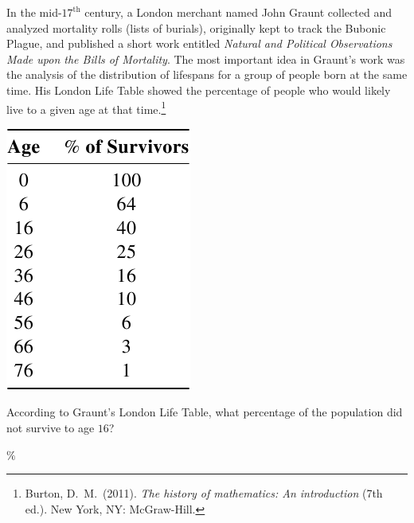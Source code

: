 \documentclass{ximera}
\begin{document}
In the mid-$17^\text{th}$ century, a London merchant named John Graunt collected and analyzed mortality rolls (lists of burials), originally kept to track the Bubonic Plague, and published a short work entitled \textit{Natural and Political Observations Made upon the Bills of Mortality}. The most important idea in Graunt's work was the analysis of the distribution of lifespans for a group of people born at the same time. His London Life Table showed the percentage of people who would likely live to a given age at that time.\footnote{Burton, D.\ M.\ (2011). \textit{The history of mathematics: An introduction} (7th ed.). New York, NY: McGraw-Hill.}
\begin{image}
\includegraphics[scale=1.5]{InsuranceTable1.png}
\end{image}

\begin{question}
According to Graunt's London Life Table, what percentage of the population did not survive to age $16$?

$\%$
	
\end{question}
\end{document}
